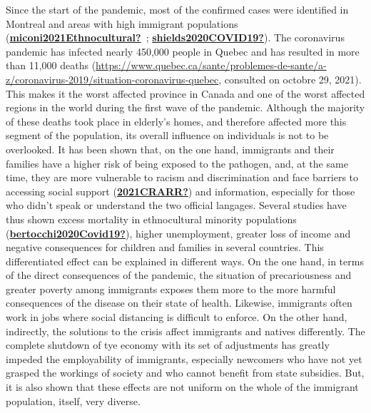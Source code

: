 \documentclass[
]{article}
\begin{document}
Since the start of the pandemic, most of the confirmed cases were identified in
Montreal and areas with high immigrant populations (\protect\hyperlink{ref-miconi2021Ethnocultural}{\textbf{miconi2021Ethnocultural?}}~; \protect\hyperlink{ref-shields2020COVID19}{\textbf{shields2020COVID19?}}). The coronavirus pandemic has infected nearly 450,000
people in Quebec and has resulted in more than 11,000 deaths
(\url{https://www.quebec.ca/sante/problemes-de-sante/a-z/coronavirus-2019/situation-coronavirus-quebec},
consulted on octobre 29, 2021). This makes it the worst affected province in
Canada and one of the worst affected regions in the world during the first wave
of the pandemic. Although the majority of these deaths took place in elderly's
homes, and therefore affected more this segment of the population, its overall
influence on individuals is not to be overlooked. It has been shown that, on the
one hand, immigrants and their families have a higher risk of being exposed to
the pathogen, and, at the same time, they are more vulnerable to racism and
discrimination and face barriers to accessing social support (\protect\hyperlink{ref-2021CRARR}{\textbf{2021CRARR?}}) and
information, especially for those who didn't speak or understand the two
official langages.
Several
studies have thus shown excess mortality in ethnocultural minority populations
(\protect\hyperlink{ref-bertocchi2020Covid19}{\textbf{bertocchi2020Covid19?}}), higher unemployment, greater loss of income and
negative consequences for children and families in several countries. This
differentiated effect can be explained in different ways. On the one hand, in
terms of the direct consequences of the pandemic, the situation of
precariousness and greater poverty among immigrants exposes them more to the
more harmful consequences of the disease on their state of health. Likewise,
immigrants often work in jobs where social distancing is difficult to enforce.
On the other hand, indirectly, the solutions to the crisis affect immigrants and
natives differently. The complete shutdown of tye economy with its set of
adjustments has greatly impeded the employability of immigrants, especially
newcomers who have not yet grasped the workings of society and who cannot
benefit from state subsidies. But, it is also shown that these effects are not
uniform on the whole of the immigrant population, itself, very diverse.
\end{document}
